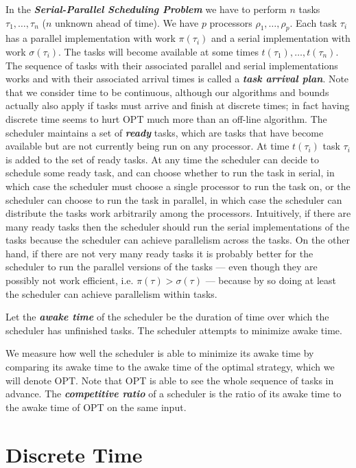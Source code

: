 \documentclass[twocolumn]{article}[10pt]
\newcommand{\defn}[1]{{\textit{\textbf{\boldmath #1}}}\xspace}
\begin{document}
In the \defn{Serial-Parallel Scheduling Problem} we have to
perform $n$ tasks $\tau_1, \ldots, \tau_n$ ($n$ unknown ahead of
time). We have $p$ processors $\rho_1, \ldots, \rho_p$. Each task
$\tau_i$ has a parallel implementation with work $\pi(\tau_i)$ and a
serial implementation with work $\sigma(\tau_i)$. The tasks will become
available at some times $t(\tau_1), \ldots, t(\tau_n)$. 
The sequence of tasks with their associated parallel and serial
implementations works and with their associated arrival times is
called a \defn{task arrival plan}.
Note that we consider time to be continuous, although our
algorithms and bounds actually also apply if tasks must arrive
and finish at discrete times; in fact having discrete time seems
to hurt OPT much more than an off-line algorithm.
The scheduler maintains a set of \defn{ready} tasks, which are tasks that have
become available but are not currently being run on any
processor. At time $t(\tau_i)$ task $\tau_i$ is added to the set of
ready tasks. At any time the scheduler can decide to schedule
some ready task, and can choose whether to run the task in
serial, in which case the scheduler must choose a single
processor to run the task on, or the scheduler can choose to run
the task in parallel, in which case the scheduler can distribute
the tasks work arbitrarily among the processors. Intuitively, if
there are many ready tasks then the scheduler should run the
serial implementations of the tasks because the scheduler can
achieve parallelism across the tasks. On the other hand, if there
are not very many ready tasks it is probably better for the
scheduler to run the parallel versions of the tasks --- even
though they are possibly not work efficient, i.e. $\pi(\tau) >
\sigma(\tau)$ --- because by so doing at least the scheduler can
achieve parallelism within tasks.

Let the \defn{awake time} of the scheduler be the duration of
time over which the scheduler has unfinished tasks.
The scheduler attempts to minimize awake time.

We measure how well the scheduler is able to minimize its awake
time by comparing its awake time to the awake time of the optimal
strategy, which we will denote OPT. Note that OPT is able to see
the whole sequence of tasks in advance.
The \defn{competitive ratio} of a scheduler is the ratio
of its awake time to the awake time of OPT on the same input.

\section{Discrete Time}
\end{document}
